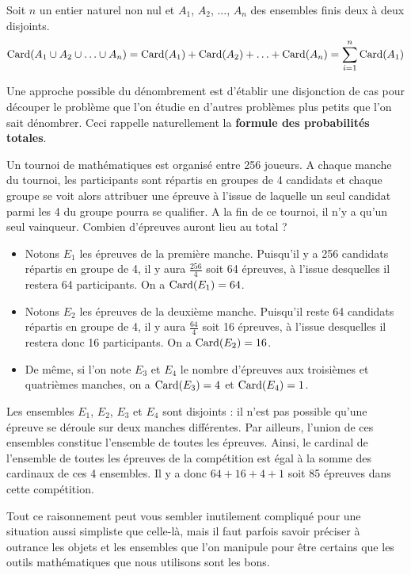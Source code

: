 \documentclass[11pt,fleqn, openany]{book} %
\begin{document}
\begin{proposition} Soit $n$ un entier naturel non nul et $A_1$, $A_2$, ..., $A_n$ des ensembles finis deux à deux disjoints.
\[ \mathrm{Card}(A_1 \cup A_2 \cup \ldots  \cup A_n)= \mathrm{Card}(A_1) + \mathrm{Card}(A_2)+\ldots + \mathrm{Card}(A_n)= \sum_{i=1}^n \mathrm{Card}(A_1)\]
\vspace{-0.5cm}\end{proposition}

Une approche possible du dénombrement est d'établir une disjonction de cas pour découper le problème que l'on étudie en d'autres problèmes plus petits que l'on sait dénombrer. Ceci rappelle naturellement la \textbf{formule des probabilités totales}.

\begin{example}Un tournoi de mathématiques est organisé entre 256 joueurs. A chaque manche du tournoi, les participants sont répartis en groupes de 4 candidats et chaque groupe se voit alors attribuer une épreuve à l'issue de laquelle un seul candidat parmi les 4 du groupe pourra se qualifier. A la fin de ce tournoi, il n'y a qu'un seul vainqueur. Combien d'épreuves auront lieu au total ?
\begin{itemize}
\item Notons $E_1$ les épreuves de la première manche. Puisqu'il y a 256 candidats répartis en groupe de 4, il y aura $\frac{256}{4}$ soit 64 épreuves, à l'issue desquelles il restera 64 participants. On a $\mathrm{Card}(E_1)=64$.
\item Notons $E_2$ les épreuves de la deuxième manche. Puisqu'il reste 64 candidats répartis en groupe de 4, il y aura $\frac{64}{4}$ soit 16 épreuves, à l'issue desquelles il restera donc 16 participants. On a $\mathrm{Card}(E_2)=16$.
\item De même, si l'on note $E_3$ et $E_4$ le nombre d'épreuves aux troisièmes et quatrièmes manches, on a $\mathrm{Card}(E_3)=4$ et $\mathrm{Card}(E_4)=1$.
\end{itemize}
Les ensembles $E_1$, $E_2$, $E_3$ et $E_4$ sont disjoints : il n'est pas possible qu'une épreuve se déroule sur deux manches différentes. Par ailleurs, l'union de ces ensembles constitue l'ensemble de toutes les épreuves. Ainsi, le cardinal de l'ensemble de toutes les épreuves de la compétition est égal à la somme des cardinaux de ces 4 ensembles. Il y a donc $64+16+4+1$ soit 85 épreuves dans cette compétition.\end{example}
Tout ce raisonnement peut vous sembler inutilement compliqué pour une situation aussi simpliste que celle-là, mais il faut parfois savoir préciser à outrance les objets et les ensembles que l'on manipule pour être certains que les outils mathématiques que nous utilisons sont les bons.
\end{document}
